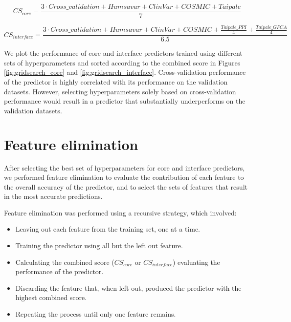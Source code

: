 \begin{equation} \label{eq:combined_score_core}
    CS_{core} = \frac{3 \cdot Cross\_validation + Humsavar + ClinVar + COSMIC + Taipale}{7}
\end{equation}

\begin{equation} \label{eq:combined_score_interface}
    CS_{interface} = \frac{3 \cdot Cross\_validation + Humsavar + ClinVar + COSMIC + \frac{Taipale\_{PPI}}{4} + \frac{Taipale\_{GPCA}}{4}}{6.5}
\end{equation}

We plot the performance of core and interface predictors trained using different sets of hyperparameters and sorted according to the combined score in Figures \ref{fig:gridsearch_core} and \ref{fig:gridsearch_interface}. Cross-validation performance of the predictor is highly correlated with its performance on the validation datasets. However, selecting hyperparameters solely based on cross-validation performance would result in a predictor that substantially underperforms on the validation datasets.

\clearpage



\clearpage
\section{Feature elimination}

After selecting the best set of hyperparameters for core and interface predictors, we performed feature elimination to evaluate the contribution of each feature to the overall accuracy of the predictor, and to select the sets of features that result in the most accurate predictions.

Feature elimination was performed using a recursive strategy, which involved:

\vspace{-\topsep}
\begin{itemize}
	\itemsep0em
	\item Leaving out each feature from the training set, one at a time.
	\item Training the predictor using all but the left out feature.
	\item Calculating the combined score ($CS_{core}$ or $CS_{interface}$) evaluating the performance of the predictor.
	\item Discarding the feature that, when left out, produced the predictor with the highest combined score.
	\item Repeating the process until only one feature remains.
\end{itemize}

